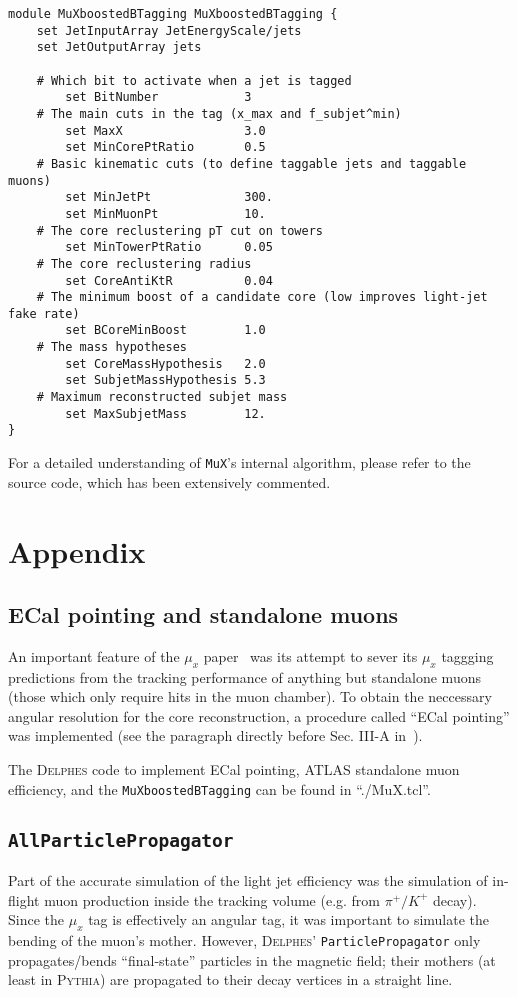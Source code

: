 \documentclass[10pt]{article}
\newcommand{\muX}{$\mu_{x}^{}$}
\newcommand{\muXmodFull}{\texttt{MuXboostedBTagging}}
\newcommand{\muXmod}{\texttt{MuX}}
\newcommand{\delphes}{\textsc{Delphes}}
\begin{document}
\begin{lstlisting}
module MuXboostedBTagging MuXboostedBTagging {
	set JetInputArray JetEnergyScale/jets
	set JetOutputArray jets

	# Which bit to activate when a jet is tagged
		set BitNumber            3
	# The main cuts in the tag (x_max and f_subjet^min)
		set MaxX                 3.0
		set MinCorePtRatio       0.5
	# Basic kinematic cuts (to define taggable jets and taggable muons)
		set MinJetPt             300.
		set MinMuonPt            10.
	# The core reclustering pT cut on towers
		set MinTowerPtRatio      0.05
	# The core reclustering radius
		set CoreAntiKtR          0.04
	# The minimum boost of a candidate core (low improves light-jet fake rate)
		set BCoreMinBoost        1.0
	# The mass hypotheses
		set CoreMassHypothesis   2.0
		set SubjetMassHypothesis 5.3
	# Maximum reconstructed subjet mass
		set MaxSubjetMass        12.
}
\end{lstlisting}

For a detailed understanding of {\muXmod}'s internal algorithm, please refer
to the source code, which has been extensively commented.

\section{Appendix}
\subsection{ECal pointing and standalone muons}

An important feature of the {\muX} paper~\cite{Pedersen:MuX} was its attempt to
sever its {\muX} taggging predictions from the tracking performance of
anything but standalone muons (those which only require hits in the muon
chamber). To obtain the neccessary angular resolution for the core
reconstruction, a procedure called ``ECal pointing'' was implemented (see the
paragraph directly before Sec. III-A in~\cite{Pedersen:MuX}).

The {\delphes} code to implement ECal pointing, ATLAS standalone muon
efficiency, and the {\muXmodFull} can be found in ``./MuX.tcl''.

\subsection{\texttt{AllParticlePropagator}}

Part of the accurate simulation of the light jet efficiency was the simulation
of in-flight muon production inside the tracking volume (e.g. from
$\pi^{+}/K^{+}$ decay). Since the {\muX} tag is effectively an angular tag, it
was important to simulate the bending of the muon's mother. However, {\delphes}'
\texttt{ParticlePropagator} only propagates/bends ``final-state'' particles in
the magnetic field; their mothers (at least in \textsc{Pythia}) are propagated
to their decay vertices in a straight line.
\end{document}

